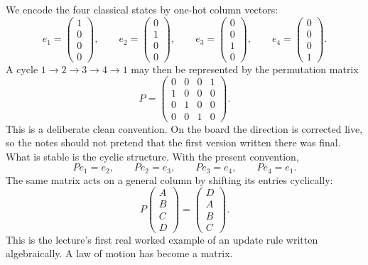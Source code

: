 We encode the four classical states by one-hot column vectors:
\begin{equation}
e_1=
\begin{pmatrix}
1\\0\\0\\0
\end{pmatrix},
\qquad
e_2=
\begin{pmatrix}
0\\1\\0\\0
\end{pmatrix},
\qquad
e_3=
\begin{pmatrix}
0\\0\\1\\0
\end{pmatrix},
\qquad
e_4=
\begin{pmatrix}
0\\0\\0\\1
\end{pmatrix}.
\end{equation}
A cycle \(1\to2\to3\to4\to1\) may then be represented by the permutation matrix
\begin{equation}
P=
\begin{pmatrix}
0&0&0&1\\
1&0&0&0\\
0&1&0&0\\
0&0&1&0
\end{pmatrix}.
\end{equation}
This is a deliberate clean convention. On the board the direction is corrected live, so the notes should not pretend that the first version written there was final. What is stable is the cyclic structure. With the present convention,
\begin{equation}
Pe_1=e_2,\qquad
Pe_2=e_3,\qquad
Pe_3=e_4,\qquad
Pe_4=e_1.
\end{equation}
The same matrix acts on a general column by shifting its entries cyclically:
\begin{equation}
P
\begin{pmatrix}
A\\
B\\
C\\
D
\end{pmatrix}
=
\begin{pmatrix}
D\\
A\\
B\\
C
\end{pmatrix}.
\end{equation}
This is the lecture's first real worked example of an update rule written algebraically. A law of motion has become a matrix.

